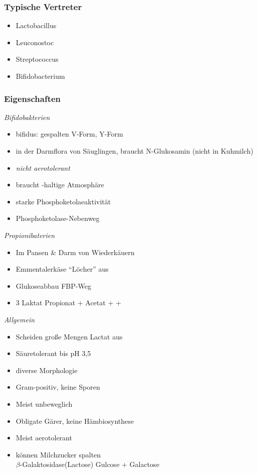 \begin{description}
\subsubsection*{Typische Vertreter}
\begin{itemize}
	\item Lactobacillus
	\item Leuconostoc
	\item Streptococcus
	\item Bifidobacterium
\end{itemize}

\subsubsection*{Eigenschaften}

\emph{Bifidobakterien}
\begin{itemize}
	\item bifidus: gespalten \textrightarrow V-Form, Y-Form
	\item in der Darmflora von Säuglingen, braucht N-Glukosamin (nicht in Kuhmilch)
	\item \textsl{nicht aerotolerant}
	\item braucht -haltige Atmosphäre
	\item starke Phosphoketolaeaktivität
	\item Phosphoketolase-Nebenweg
\end{itemize}

\emph{Propionibaterien}
\begin{itemize}
	\item Im Pansen \& Darm von Wiederkäuern
	\item Emmentalerkäse \textrigharrow ``Löcher'' aus 
	\item Glukoseabbau FBP-Weg
	\item 3 Laktat  Propionat + Acetat +  + 
\end{itemize}

\emph{Allgemein}
\begin{itemize}
	\item Scheiden große Mengen Lactat aus
	\item Säuretolerant bis pH 3,5
	\item diverse Morphologie
	\item Gram-positiv, keine Sporen
	\item Meist unbeweglich
	\item Obligate Gärer, keine Hämbiosynthese
	\item Meist aerotolerant
	\item können Milchzucker spalten\\ $\beta$-Galaktosidase(Lactose) \textrightarrow Gulcose + Galactose
\end{itemize}


\end{description}
